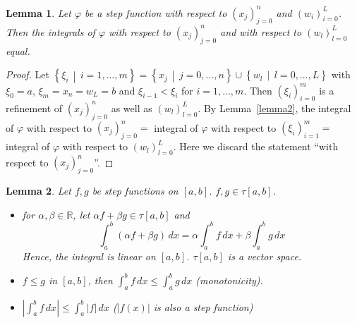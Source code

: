 \documentclass{article}
\newtheorem{lemma}{Lemma}  \numberwithin{lemma}{section}
\newcommand{\setdef}[2]{\left\{\left.#1\,\middle|\,#2\right.\right\}}
\newcommand{\card}[1]{\left|#1\right|}
\begin{document}
\begin{lemma} %
  \label{lemma3}
  Let $\varphi$ be a step function with respect to $(x_j)_{j=0}^n$ and $(w_i)_{i=0}^L$.
  Then the integrals of $\varphi$ with respect to $(x_j)_{j=0}^n$ and with respect to $(w_l)_{l=0}^L$ equal.
\end{lemma}

\begin{proof}
  Let $\setdef{\xi_i}{i = 1, \dots, m} = \setdef{x_j}{j = 0, \dots, n} \cup \setdef{w_l}{l = 0, \dots, L}$
  with $\xi_0 = a$, $\xi_m = x_n = w_L = b$ and $\xi_{i-1} < \xi_i$ for $i = 1, \dots, m$.
  Then $(\xi_i)_{i=0}^m$ is a refinement of $(x_j)_{j=0}^n$ as well as $(w_l)_{l=0}^L$.
  By Lemma~\ref{lemma2}, the integral of $\varphi$ with respect to $(x_j)_{j=0}^n =$ integral of $\varphi$
  with respect to $(\xi_i)_{i=1}^m =$ integral of $\varphi$ with respect to $(w_l)_{l=0}^L$.
  Here we discard the statement \enquote{with respect to $(x_j)_{j=0}^n$}.
\end{proof}

\begin{lemma} %
  Let $f,g$ be step functions on $[a,b]$. $f,g \in \tau[a,b]$.
  \begin{itemize}
    \item
      for $\alpha, \beta \in \mathbb R$, let $\alpha f + \beta g \in \tau[a,b]$ and
      \[ \int_a^b (\alpha f + \beta g) \, dx = \alpha \int_a^bf \, dx + \beta \int_a^b g \, dx \]
      Hence, the integral is linear on $[a,b]$. $\tau[a,b]$ is a vector space.
    \item $f \leq g$ in $[a,b]$, then $\int_a^b f \, dx \leq \int_a^b g \, dx$ (monotonicity).
    \item $\card{\int_a^b f \, dx} \leq \int_a^b \card{f} \, dx$ ($\card{f(x)}$ is also a step function)
  \end{itemize}
\end{lemma}
\end{document}
